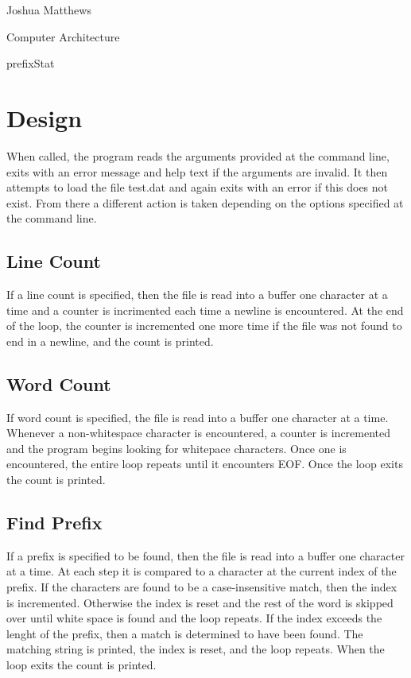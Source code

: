 \documentclass[letterpaper,12pt]{article}
\begin{document}
\noindent Joshua Matthews

\noindent Computer Architecture

\noindent prefixStat

\section{Design}
When called, the program reads the arguments provided at the command line, exits with an error message and help text if the arguments are invalid. It then attempts to load the file test.dat and again exits with an error if this does not exist. From there a different action is taken depending on the options specified at the command line.

\subsection{Line Count}
If a line count is specified, then the file is read into a buffer one character at a time and a counter is incrimented each time a newline is encountered. At the end of the loop, the counter is incremented one more time if the file was not found to end in a newline, and the count is printed.

\subsection{Word Count}
If word count is specified, the file is read into a buffer one character at a time. Whenever a non-whitespace character is encountered, a counter is incremented and the program begins looking for whitepace characters. Once one is encountered, the entire loop repeats until it encounters EOF.
Once the loop exits the count is printed.

\subsection{Find Prefix}
If a prefix is specified to be found, then the file is read into a buffer one character at a time. At each step it is compared to a character at the current index of the prefix. If the characters are found to be a case-insensitive match, then the index is incremented. Otherwise the index is reset and the rest of the word is skipped over until white space is found and the loop repeats. If the index exceeds the lenght of the prefix, then a match is determined to have been found. The matching string is printed, the index is reset, and the loop repeats. When the loop exits the count is printed.
\end{document}

